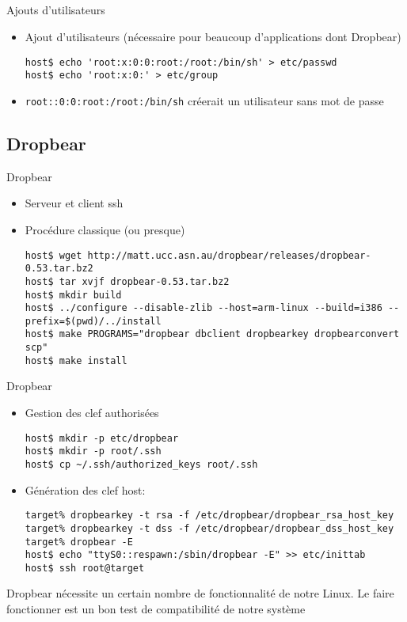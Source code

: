 \subsection{}

\begin{frame}[fragile=singleslide]{Ajouts d'utilisateurs}
  \begin{itemize}
  \item Ajout d'utilisateurs  (nécessaire pour beaucoup d'applications
    dont Dropbear)
    \begin{lstlisting}
host$ echo 'root:x:0:0:root:/root:/bin/sh' > etc/passwd
host$ echo 'root:x:0:' > etc/group
    \end{lstlisting}
  \item  \verb'root::0:0:root:/root:/bin/sh'  créerait un  utilisateur
    sans mot de passe
  \end{itemize}
\end{frame}

\subsection{Dropbear}

\begin{frame}[fragile=singleslide]{Dropbear}
  \begin{itemize}
  \item Serveur et client ssh
  \item Procédure classique (ou presque)
    \begin{lstlisting}
host$ wget http://matt.ucc.asn.au/dropbear/releases/dropbear-0.53.tar.bz2
host$ tar xvjf dropbear-0.53.tar.bz2
host$ mkdir build
host$ ../configure --disable-zlib --host=arm-linux --build=i386 --prefix=$(pwd)/../install
host$ make PROGRAMS="dropbear dbclient dropbearkey dropbearconvert scp"
host$ make install
    \end{lstlisting}
  \end{itemize}
\end{frame}

\begin{frame}[fragile=singleslide]{Dropbear}
  \begin{itemize}
  \item Gestion des clef authorisées
    \begin{lstlisting}
host$ mkdir -p etc/dropbear
host$ mkdir -p root/.ssh
host$ cp ~/.ssh/authorized_keys root/.ssh
    \end{lstlisting}%
  \item Génération des clef host:
    \begin{lstlisting}
target% dropbearkey -t rsa -f /etc/dropbear/dropbear_rsa_host_key
target% dropbearkey -t dss -f /etc/dropbear/dropbear_dss_host_key
target% dropbear -E
host$ echo "ttyS0::respawn:/sbin/dropbear -E" >> etc/inittab
host$ ssh root@target
    \end{lstlisting}
  \end{itemize}
  Dropbear  nécessite un  certain  nombre de  fonctionnalité de  notre
  Linux.  Le faire  fonctionner est  un bon  test de  compatibilité de
  notre système
\end{frame}

